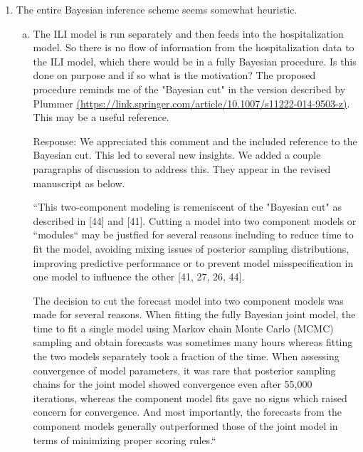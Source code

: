 \documentclass{article}
\newcommand{\spencer}[1]{{\color{red} Response: #1}}
\begin{document}
\begin{enumerate}[1.]
\item The entire Bayesian inference scheme seems somewhat heuristic.

\begin{enumerate}[a.]
\item The ILI model is run separately and then feeds into the hospitalization model. So there is no
flow of information from the hospitalization data to the ILI model, which there would be in a fully
Bayesian procedure. Is this done on purpose and if so what is the motivation? The proposed
procedure reminds me of the "Bayesian cut" in the version described by Plummer
\href{(https://link.springer.com/article/10.1007/s11222-014-9503-z)}{(https://link.springer.com/article/10.1007/s11222-014-9503-z)}.
This may be a useful reference.

\spencer{We appreciated this comment and the included reference to the Bayesian
cut. This led to several new insights. 
We added a couple paragraphs of discussion to address this. They appear in
the revised manuscript as below.

``This two-component modeling is remeniscent of the "Bayesian cut" as 
described in [44] and [41]. Cutting a model
into two component models or ``modules`` may be justfied for several reasons
including to reduce time to fit the model, avoiding mixing issues of posterior
sampling distributions, improving predictive performance or to prevent
model misspecification in one model to influence the other 
[41, 27, 26, 44].

The decision to cut the forecast model into two component models
was made for several reasons.
When fitting the fully Bayesian joint model, the time to fit a single model using
Markov chain Monte Carlo (MCMC) sampling and
obtain forecasts was sometimes many hours whereas fitting the two models
separately took a fraction of the time. When assessing convergence of model
parameters, it was rare that posterior sampling chains for the joint model
showed convergence even after 55,000 iterations, whereas the component model 
fits gave no signs which raised concern for convergence. And most importantly,
the forecasts from the component models generally outperformed those of the 
joint model in terms of minimizing proper scoring rules.``}


\end{enumerate}
\end{enumerate}
\end{document}
